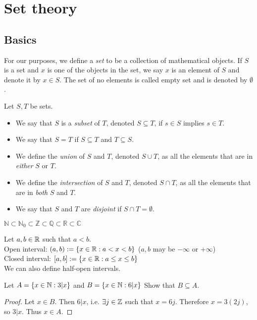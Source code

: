 \documentclass{article}
\begin{document}
\section{Set theory}

\subsection{Basics}

For our purposes, we define a \emph{set} to be a collection of mathematical objects. If $S$ is a set and $x$ is one of the objects in the set, we say $x$ is an element of $S$ and denote it by $x\in S$. The set of no elements is called empty set and is denoted by $\emptyset$.

\begin{definition}
Let $S, T$ be sets. 
\begin{itemize}
    \item We say that $S$ is a \emph{subset} of $T$, denoted $S\subseteq T$, if $s\in S$ implies $s\in T$. 
    \item We say that $S=T$ if $S\subseteq T$ and $T\subseteq S$.
    \item We define the \emph{union} of $S$ and $T$, denoted $S \cup T$, as all the elements that are in \emph{either} $S$ or $T$.
    \item We define the \emph{intersection} of $S$ and $T$, denoted $S \cap T$, as all the elements that are in \emph{both} $S$ and $T$.
    \item We say that $S$ and $T$ are \emph{disjoint} if $S \cap T = \emptyset$.
\end{itemize}
\end{definition}

\begin{example}
$\mathbb{N} \subset \mathbb{N}_0 \subset \mathbb{Z} \subset \mathbb{Q} \subset \mathbb{R} \subset \mathbb{C}$
\end{example}

\begin{example}  Let $a, b \in {\mathbb{R}}$ such that $a < b$. \\
Open interval: $(a,b) := \{x \in {\mathbb{R}} : a < x < b \}$  ($a,b$ may be $- \infty$ or $+ \infty$)\\
Closed interval: $[a,b] := \{x \in {\mathbb{R}} : a \leq x \leq b \}$ \\
We can also define half-open intervals.  
\end{example}

\begin{example}
Let $A = \{x \in {\mathbb{N}}: 3 | x \}$ and $B = \{x \in {\mathbb{N}}: 6 | x \}$
Show that $B \subseteq A$. 
\end{example}
\begin{proof}
Let $x \in B$. Then $6 |x$, i.e. $\exists j \in {\mathbb{Z}}$ such that $x = 6j$. Therefore $x = 3 (2j)$, so $3|x$. Thus $x \in A$.
\end{proof}
\end{document}
